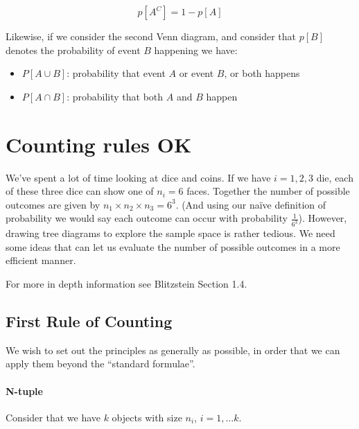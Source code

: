 \documentclass[12pt]{extbook}
\begin{document}
\begin{displaymath}
p[A^C] = 1 - p[A]
\end{displaymath}


Likewise, if we consider the second Venn diagram, and consider that $p[B]$ denotes the probability of event $B$ happening we have:

\begin{itemize}
\item $P[A \cup B]$: probability that event $A$ or event $B$, or both happens
\item $P[A \cap B]$: probability that both $A$ and $B$ happen
\end{itemize}


\begin{enumerate}

\end{enumerate}



\chapter{Counting rules OK}

We've spent a lot of time looking at dice and coins.   If we have $i=1,2,3$ die, each of these three dice can show one of $n_i=6$ faces.   Together the number of possible outcomes are given by $n_1 \times n_2 \times n_3 = 6^3$.   (And using our na\"ive definition of probability we would say each outcome can occur with probability $\frac{1}{6^3}$).   However, drawing tree diagrams to explore the sample space is rather tedious.   We need some ideas that can let us evaluate the number of possible outcomes in a more efficient manner.

For more in depth information see Blitzstein Section 1.4.


\section{First Rule of Counting}

We wish to set out the principles as generally as possible, in order that we can apply them beyond the ``standard formulae''.

\subsubsection{N-tuple}

Consider that we have $k$ objects with size  $n_i$, $i=1, \dots k$.
\end{document}
